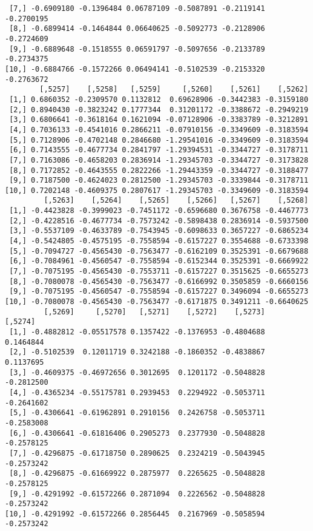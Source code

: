 \documentclass[
  letterpaper,
  DIV=11,
  numbers=noendperiod]{scrreprt}
\begin{document}
\begin{verbatim}
 [7,] -0.6909180 -0.1396484 0.06787109 -0.5087891 -0.2119141 -0.2700195
 [8,] -0.6899414 -0.1464844 0.06640625 -0.5092773 -0.2128906 -0.2724609
 [9,] -0.6889648 -0.1518555 0.06591797 -0.5097656 -0.2133789 -0.2734375
[10,] -0.6884766 -0.1572266 0.06494141 -0.5102539 -0.2153320 -0.2763672
        [,5257]    [,5258]   [,5259]     [,5260]    [,5261]    [,5262]
 [1,] 0.6860352 -0.2309570 0.1132812  0.69628906 -0.3442383 -0.3159180
 [2,] 0.8940430 -0.3823242 0.1777344  0.31201172 -0.3388672 -0.2949219
 [3,] 0.6806641 -0.3618164 0.1621094 -0.07128906 -0.3383789 -0.3212891
 [4,] 0.7036133 -0.4541016 0.2866211 -0.07910156 -0.3349609 -0.3183594
 [5,] 0.7128906 -0.4702148 0.2846680 -1.29541016 -0.3349609 -0.3183594
 [6,] 0.7143555 -0.4677734 0.2841797 -1.29394531 -0.3344727 -0.3178711
 [7,] 0.7163086 -0.4658203 0.2836914 -1.29345703 -0.3344727 -0.3173828
 [8,] 0.7172852 -0.4643555 0.2822266 -1.29443359 -0.3344727 -0.3188477
 [9,] 0.7187500 -0.4624023 0.2812500 -1.29345703 -0.3339844 -0.3178711
[10,] 0.7202148 -0.4609375 0.2807617 -1.29345703 -0.3349609 -0.3183594
         [,5263]    [,5264]    [,5265]    [,5266]   [,5267]    [,5268]
 [1,] -0.4423828 -0.3999023 -0.7451172 -0.6596680 0.3676758 -0.4467773
 [2,] -0.4228516 -0.4677734 -0.7573242 -0.5898438 0.2836914 -0.5937500
 [3,] -0.5537109 -0.4633789 -0.7543945 -0.6098633 0.3657227 -0.6865234
 [4,] -0.5424805 -0.4575195 -0.7558594 -0.6157227 0.3554688 -0.6733398
 [5,] -0.7094727 -0.4565430 -0.7563477 -0.6162109 0.3525391 -0.6679688
 [6,] -0.7084961 -0.4560547 -0.7558594 -0.6152344 0.3525391 -0.6669922
 [7,] -0.7075195 -0.4565430 -0.7553711 -0.6157227 0.3515625 -0.6655273
 [8,] -0.7080078 -0.4565430 -0.7563477 -0.6166992 0.3505859 -0.6660156
 [9,] -0.7075195 -0.4560547 -0.7558594 -0.6157227 0.3496094 -0.6655273
[10,] -0.7080078 -0.4565430 -0.7563477 -0.6171875 0.3491211 -0.6640625
         [,5269]     [,5270]   [,5271]    [,5272]    [,5273]    [,5274]
 [1,] -0.4882812 -0.05517578 0.1357422 -0.1376953 -0.4804688  0.1464844
 [2,] -0.5102539  0.12011719 0.3242188 -0.1860352 -0.4838867  0.1137695
 [3,] -0.4609375 -0.46972656 0.3012695  0.1201172 -0.5048828 -0.2812500
 [4,] -0.4365234 -0.55175781 0.2939453  0.2294922 -0.5053711 -0.2641602
 [5,] -0.4306641 -0.61962891 0.2910156  0.2426758 -0.5053711 -0.2583008
 [6,] -0.4306641 -0.61816406 0.2905273  0.2377930 -0.5048828 -0.2578125
 [7,] -0.4296875 -0.61718750 0.2890625  0.2324219 -0.5043945 -0.2573242
 [8,] -0.4296875 -0.61669922 0.2875977  0.2265625 -0.5048828 -0.2578125
 [9,] -0.4291992 -0.61572266 0.2871094  0.2226562 -0.5048828 -0.2573242
[10,] -0.4291992 -0.61572266 0.2856445  0.2167969 -0.5058594 -0.2573242

\end{verbatim}
\end{document}
